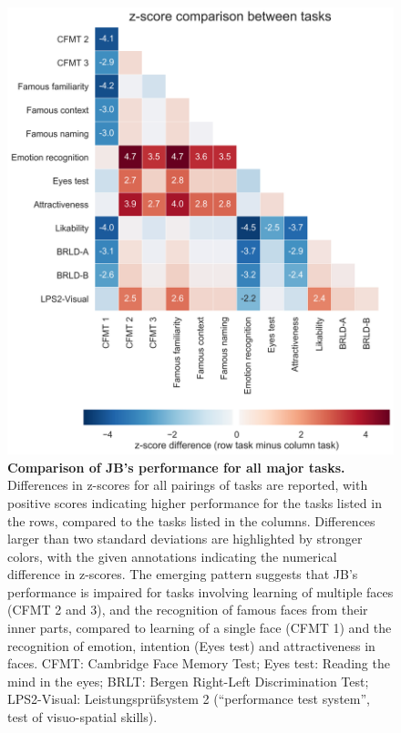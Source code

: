 \documentclass[fleqn,10pt]{SelfArx} %
\begin{document}
\begin{figure}[htbp]
	
	\renewcommand{\familydefault}{\sfdefault}\normalfont
	\centering
	\includegraphics[width=\columnwidth]{../reports/figures/overview_heatmap_mod.png}
	\vspace*{-3mm}
 		\caption{\textbf{Comparison of JB's performance for all major tasks.} Differences in z-scores for all pairings of tasks are reported, with positive scores indicating higher performance for the tasks listed in the rows, compared to the tasks listed in the columns. Differences larger than two standard deviations are highlighted by stronger colors, with the given annotations indicating the numerical difference in z-scores. The emerging pattern suggests that JB’s performance is impaired for tasks involving learning of multiple faces (CFMT 2 and 3), and the recognition of famous faces from their inner parts, compared to learning of a single face (CFMT 1) and the recognition of emotion, intention (Eyes test) and attractiveness in faces. CFMT: Cambridge Face Memory Test; Eyes test: Reading the mind in the eyes; BRLT: Bergen Right-Left Discrimination Test; LPS2-Visual: Leistungsprüfsystem 2 (“performance test system”, test of visuo-spatial skills).}%
 		\label{fig:heat}
	
\end{figure}
\end{document}

